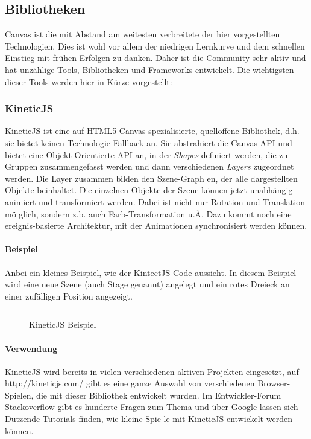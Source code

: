 \documentclass[a4paper, 12pt]{article}
\begin{document}
\subsection{Bibliotheken}
Canvas ist die mit Abstand am weitesten verbreitete der hier vorgestellten Technologien. Dies ist wohl vor allem der niedrigen Lernkurve und dem schnellen Einstieg mit frühen Erfolgen zu danken. Daher ist die Community sehr aktiv und hat unzählige Tools, Bibliotheken und Frameworks entwickelt. Die wichtigsten dieser Tools werden hier in Kürze vorgestellt:
\subsubsection{KineticJS}
KineticJS ist eine auf HTML5 Canvas spezialisierte, quelloffene Bibliothek, d.h. sie bietet keinen Technologie-Fallback an. Sie abstrahiert die Canvas-API und bietet eine Objekt-Orientierte API an, in der \emph{Shapes} definiert werden, die zu Gruppen zusammengefasst werden und dann verschiedenen \emph{Layers} zugeordnet werden. Die Layer zusammen bilden den Szene-Graph
en, der alle dargestellten Objekte beinhaltet. Die einzelnen Objekte der Szene können jetzt unabhängig animiert und transformiert werden. Dabei ist nicht nur Rotation und Translation mö
glich, sondern z.b. auch Farb-Transformation u.Ä. Dazu kommt noch eine ereignis-basierte Architektur, mit der Animationen synchronisiert werden können.
\paragraph{Beispiel}
Anbei ein kleines Beispiel, wie der KintectJS-Code aussieht. In diesem Beispiel wird eine neue Szene (auch Stage genannt) angelegt und ein rotes Dreieck an einer zufälligen Position angezeigt.
\begin{figure}[h!]
	\inputminted{javascript}{assets/kineticjs_example.js}
	\caption{KineticJS Beispiel}
	\label{kineticjs_example}
\end{figure}
\paragraph{Verwendung} KineticJS wird bereits in vielen verschiedenen aktiven Projekten eingesetzt, auf http://kineticjs.com/ gibt es eine ganze Auswahl von verschiedenen Browser-Spielen, die mit dieser Bibliothek entwickelt wurden. Im Entwickler-Forum Stackoverflow gibt es hunderte Fragen zum Thema und über Google lassen sich Dutzende Tutorials finden, wie kleine Spie
le mit KineticJS entwickelt werden können.\cite{KineticJS}
\end{document}

